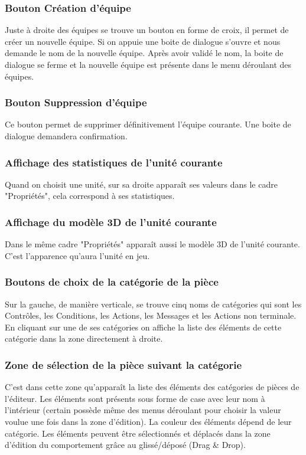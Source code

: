 \documentclass{report}
\begin{document}
\subsubsection{Bouton Création d'équipe}
Juste à droite des équipes se trouve un bouton en forme de croix, il permet de créer un nouvelle équipe. Si on appuie une boite de dialogue s'ouvre et nous demande le nom de la nouvelle équipe. Après avoir validé le nom, la boite de dialogue se ferme et la nouvelle équipe est présente dans le menu déroulant des équipes.
\subsubsection{Bouton Suppression d'équipe}
Ce bouton permet de supprimer définitivement l'équipe courante. Une boite de dialogue demandera confirmation.
\subsubsection{Affichage des statistiques de l'unité courante}
Quand on choisit une unité, sur sa droite apparaît ses valeurs dans le cadre "Propriétés", cela correspond à ses statistiques.
\subsubsection{Affichage du modèle 3D de l'unité courante}
Dans le même cadre "Propriétés" apparaît aussi le modèle 3D de l'unité courante. C'est l'apparence qu'aura l'unité en jeu.

\subsubsection{Boutons de choix de la catégorie de la pièce}
Sur la gauche, de manière verticale, se trouve cinq noms de catégories qui sont les Contrôles, les Conditions, les Actions, les Messages et les Actions non terminale. En cliquant sur une de ses catégories on affiche la liste des éléments de cette catégorie dans la zone directement à droite.
\subsubsection{Zone de sélection de la pièce suivant la catégorie}
C'est dans cette zone qu’apparaît la liste des éléments des catégories de pièces de l'éditeur. Les éléments sont présents sous forme de case avec leur nom à l'intérieur (certain possède même des menus déroulant pour choisir la valeur voulue une fois dans la zone d'édition). La couleur des éléments dépend de leur catégorie.
Les éléments peuvent être sélectionnés et déplacés dans la zone d'édition du comportement grâce au glissé/déposé (Drag \& Drop).
\end{document}
